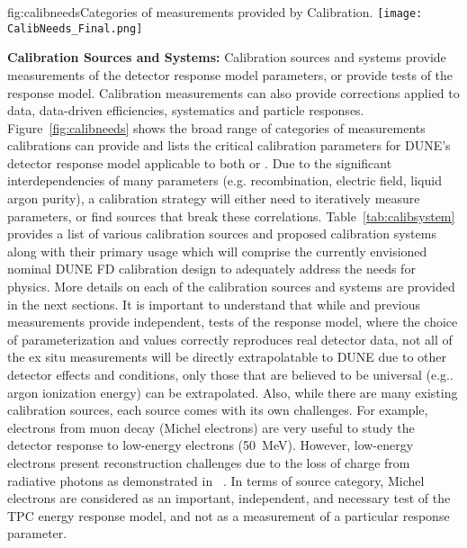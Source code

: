 \begin{dunefigure}{fig:calibneeds}{Categories of measurements provided by Calibration.}
\texttt{[image: CalibNeeds\_Final.png]}
\end{dunefigure}

\textbf{Calibration Sources and Systems:} Calibration sources and systems provide measurements of the detector response model parameters, or provide tests of the response model. 
Calibration measurements can also provide corrections applied to data, data-driven efficiencies, systematics and particle responses. Figure~\ref{fig:calibneeds} shows the broad range of categories of measurements calibrations can provide and lists the critical calibration parameters for DUNE's detector response model applicable to both  or . Due to the significant interdependencies of many parameters (e.g. recombination, electric field, liquid argon purity), a calibration strategy will either need to iteratively measure parameters, or find sources that break these correlations. Table~\ref{tab:calibsystem} provides a list of various calibration sources and proposed calibration systems along with their primary usage which will comprise the currently envisioned nominal DUNE FD calibration design to adequately address the needs for physics. More details on each of the calibration sources and systems are provided in the next sections. It is important to understand that while  and previous measurements provide independent, tests of the response model, where the choice of parameterization and values correctly reproduces real detector data, not all of the ex situ measurements will be directly extrapolatable to DUNE due to other detector effects and conditions, only those that are believed to be universal (e.g.. argon ionization energy) can be extrapolated. Also, while there are many existing calibration sources, each source comes with its own challenges. For example, electrons from muon decay (Michel electrons) are very useful to study the detector response to low-energy electrons (\SI{50}{\MeV}). However, low-energy electrons present reconstruction challenges due to the loss of charge from radiative photons as demonstrated in ~\cite{uBmichel}. In terms of source category, Michel electrons are considered as an important, independent, and necessary test of the TPC energy response model, and not as a measurement of a particular response parameter.

